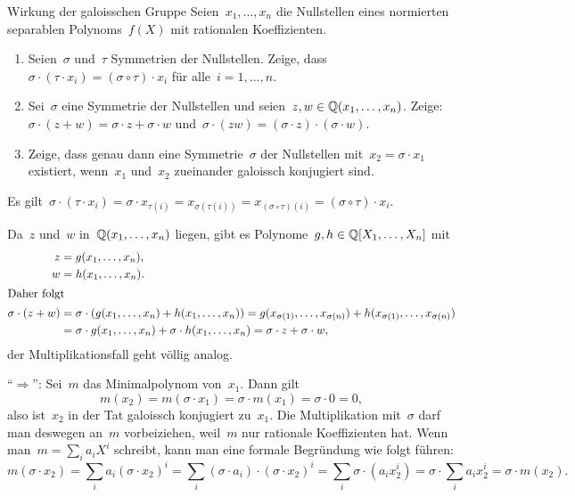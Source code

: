 \documentclass{algblatt}
\begin{document}
\vspace*{-1.5cm}

\begin{aufgabe}{Wirkung der galoisschen Gruppe}
Seien~$x_1,\ldots,x_n$ die Nullstellen eines normierten separablen
Polynoms~$f(X)$ mit rationalen Koeffizienten.
\begin{enumerate}
\item Seien~$\sigma$ und~$\tau$ Symmetrien der Nullstellen. Zeige, dass~$\sigma \cdot
(\tau \cdot x_i) = (\sigma \circ \tau) \cdot x_i$ für alle~$i = 1,\ldots,n$.

\item Sei~$\sigma$ eine Symmetrie der Nullstellen und seien~$z, w \in
\mathbb{Q}(x_1,\ldots,x_n)$. Zeige: $\sigma \cdot (z + w) = \sigma \cdot z + \sigma
\cdot w$ und~$\sigma \cdot (zw) = (\sigma \cdot z) \cdot (\sigma \cdot w)$.

\item Zeige, dass genau dann eine Symmetrie~$\sigma$ der Nullstellen
mit~$x_2 = \sigma \cdot x_1$ existiert, wenn~$x_1$ und~$x_2$ zueinander
galoissch konjugiert sind.
\end{enumerate}

\begin{loesungE}
\item Es gilt~$\sigma \cdot (\tau \cdot x_i) = \sigma \cdot x_{\tau(i)} =
x_{\sigma(\tau(i))} = x_{(\sigma \circ \tau)(i)} = (\sigma \circ \tau) \cdot
x_i$.

\item Da~$z$ und~$w$ in~$\mathbb{Q}(x_1,\ldots,x_n)$ liegen, gibt es Polynome~$g, h
\in \mathbb{Q}[X_1,\ldots,X_n]$ mit
\begin{align*}
  z &= g(x_1,\ldots,x_n), \\
  w &= h(x_1,\ldots,x_n). \\
\intertext{Daher folgt}
  \sigma \cdot (z+w) &= \sigma \cdot (g(x_1,\ldots,x_n) + h(x_1,\ldots,x_n)) =
  g(x_{\sigma(1)},\ldots,x_{\sigma(n)}) + h(x_{\sigma(1)},\ldots,x_{\sigma(n)})
  \\
  &=
  \sigma \cdot g(x_1,\ldots,x_n) + \sigma \cdot h(x_1,\ldots,x_n) =
  \sigma \cdot z + \sigma \cdot w,
\end{align*}
der Multiplikationsfall geht völlig analog.

\item "`$\Longrightarrow$"': Sei~$m$ das Minimalpolynom von~$x_1$. Dann gilt
\[ m(x_2) = m(\sigma \cdot x_1) = \sigma \cdot m(x_1) = \sigma \cdot 0 = 0, \]
also ist~$x_2$ in der Tat galoissch konjugiert zu~$x_1$.
Die Multiplikation mit~$\sigma$ darf man deswegen an~$m$ vorbeiziehen, weil~$m$
nur rationale Koeffizienten hat. Wenn man~$m = \sum_i a_i X^i$ schreibt, kann
man eine formale Begründung wie folgt führen:
\[ m(\sigma \cdot x_2) =
  \sum_i a_i (\sigma \cdot x_2)^i =
  \sum_i (\sigma \cdot a_i) \cdot (\sigma \cdot x_2)^i =
  \sum_i \sigma \cdot (a_i x_2^i) =
  \sigma \cdot \sum_i a_i x_2^i =
  \sigma \cdot m(x_2). \]


\end{loesungE}
\end{aufgabe}
\end{document}
